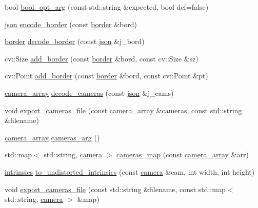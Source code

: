 \begin{DoxyCompactItemize}
\item 
bool \hyperlink{namespacetlz_a5186c46291b525427b48828632f7adec}{bool\+\_\+opt\+\_\+arg} (const std\+::string \&expected, bool def=false)
\item 
\hyperlink{namespacetlz_ac400657dfcddf6309a769aefc23eed0c}{json} \hyperlink{namespacetlz_a0f52424381098b5c19e34aef5da5232e}{encode\+\_\+border} (const \hyperlink{structtlz_1_1border}{border} \&bord)
\item 
\hyperlink{structtlz_1_1border}{border} \hyperlink{namespacetlz_a9517e892e5486b965a722d5589dc58c4}{decode\+\_\+border} (const \hyperlink{namespacetlz_ac400657dfcddf6309a769aefc23eed0c}{json} \&j\+\_\+bord)
\item 
cv\+::\+Size \hyperlink{namespacetlz_a0b91e1131356fee9a4c7a72c3b398186}{add\+\_\+border} (const \hyperlink{structtlz_1_1border}{border} \&bord, const cv\+::\+Size \&sz)
\item 
cv\+::\+Point \hyperlink{namespacetlz_a18799ba4dcde6f49e1c66d2598ddb0d0}{add\+\_\+border} (const \hyperlink{structtlz_1_1border}{border} \&bord, const cv\+::\+Point \&pt)
\item 
\hyperlink{namespacetlz_a7c35ad93fe55f736afafa798f3885c8e}{camera\+\_\+array} \hyperlink{namespacetlz_a8d445609e681336909da63eb443186b4}{decode\+\_\+cameras} (const \hyperlink{namespacetlz_ac400657dfcddf6309a769aefc23eed0c}{json} \&j\+\_\+cams)
\item 
void \hyperlink{namespacetlz_a445f7e177edcda36ece43a5fcd78615f}{export\+\_\+cameras\+\_\+file} (const \hyperlink{namespacetlz_a7c35ad93fe55f736afafa798f3885c8e}{camera\+\_\+array} \&cameras, const std\+::string \&filename)
\item 
\hyperlink{namespacetlz_a7c35ad93fe55f736afafa798f3885c8e}{camera\+\_\+array} \hyperlink{namespacetlz_aa5e0f8e51747ba6008a12ea8942ad9f7}{cameras\+\_\+arg} ()
\item 
std\+::map$<$ std\+::string, \hyperlink{structtlz_1_1camera}{camera} $>$ \hyperlink{namespacetlz_a5472d5ad8c55959e7d55be8551f53706}{cameras\+\_\+map} (const \hyperlink{namespacetlz_a7c35ad93fe55f736afafa798f3885c8e}{camera\+\_\+array} \&arr)
\item 
\hyperlink{structtlz_1_1intrinsics}{intrinsics} \hyperlink{namespacetlz_af042832f21784a7cb232f62d3b507006}{to\+\_\+undistorted\+\_\+intrinsics} (const \hyperlink{structtlz_1_1camera}{camera} \&cam, int width, int height)
\item 
void \hyperlink{namespacetlz_a5b28f7b4a28b81d7562b9cf661f1e745}{export\+\_\+cameras\+\_\+file} (const std\+::string \&filename, const std\+::map$<$ std\+::string, \hyperlink{structtlz_1_1camera}{camera} $>$ \&map)

\end{DoxyCompactItemize}
